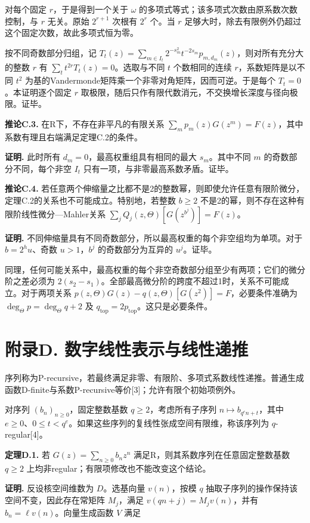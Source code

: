 \documentclass[UTF8,11pt,fontset=fandol]{ctexart}
\begin{document}
对每个固定 $r$，于是得到一个关于 $\omega$ 的多项式等式；该多项式次数由原系数次数控制，与 $r$ 无关。原始 $2^{r+1}$ 次根有 $2^r$ 个。当 $r$ 足够大时，除去有限例外仍超过这个固定次数，故此多项式恒为零。

按不同奇数部分归组，记 $T_t(z)=\sum_{m\in I_t}2^{-s_m^2}t^{-2s_m}p_{m,d_m}(z)$，则对所有充分大的整数 $r$ 有 $\sum_t t^{2r}T_t(z)=0$。选取与不同 $t$ 个数相同的连续 $r$，系数矩阵是以不同 $t^2$ 为基的Vandermonde矩阵乘一个非零对角矩阵，因而可逆。于是每个 $T_t=0$。本证明逐个固定 $r$ 取极限，随后只作有限代数消元，不交换增长深度与径向极限。证毕。

\textbf{推论C.3.} 在R下，不存在非平凡的有限关系 $\sum_m p_m(z)G(z^m)=F(z)$，其中系数有理且右端满足定理C.2的条件。

\textbf{证明.} 此时所有 $d_m=0$，最高权重组具有相同的最大 $s_m$。其中不同 $m$ 的奇数部分不同，每个非空 $I_t$ 只有一项，与非零最高系数矛盾。证毕。

\textbf{推论C.4.} 若任意两个伸缩量之比都不是2的整数幂，则即使允许任意有限阶微分，定理C.2的关系也不可能成立。特别地，若整数 $b\ge2$ 不是2的幂，则不存在这种有限阶线性微分—Mahler关系 $\sum_jQ_j(z,\Theta)[G(z^{b^j})]=F(z)$。

\textbf{证明.} 不同伸缩量具有不同奇数部分，所以最高权重的每个非空组均为单项。对于 $b=2^hu$、奇数 $u>1$，$b^j$ 的奇数部分为互异的 $u^j$。证毕。

同理，任何可能关系中，最高权重的每个非空奇数部分组至少有两项；它们的微分阶之差必须为 $2(s_2-s_1)$。全部最高微分阶的跨度不超过1时，关系不可能成立。对于两项关系 $p(z,\Theta)G(z)-q(z,\Theta)[G(z^2)]=F$，必要条件准确为 $\deg_\Theta p=\deg_\Theta q+2$ 及 $q_{\mathrm{top}}=2p_{\mathrm{top}}$。这只是必要条件。

\section*{附录D. 数字线性表示与线性递推}
序列称为P-recursive，若最终满足非零、有限阶、多项式系数线性递推。普通生成函数D-finite与系数P-recursive等价[3]；允许有限个初始项例外。

对序列 $(b_n)_{n\ge0}$，固定整数基数 $q\ge2$，考虑所有子序列 $n\mapsto b_{q^en+t}$，其中 $e\ge0$、$0\le t<q^e$。如果这些序列的复线性张成空间有限维，称该序列为 $q$-regular[4]。

\textbf{定理D.1.} 若 $G(z)=\sum_{n\ge0}b_nz^n$ 满足R，则其系数序列在任意固定整数基数 $q\ge2$ 上均非regular；有限项修改也不能改变这个结论。

\textbf{证明.} 反设核空间维数为 $D$。选基向量 $v(n)$，按模 $q$ 抽取子序列的操作保持该空间不变，因此存在常矩阵 $M_j$，满足 $v(qn+j)=M_jv(n)$，并有 $b_n=\ell v(n)$。向量生成函数 $V$ 满足
\end{document}

